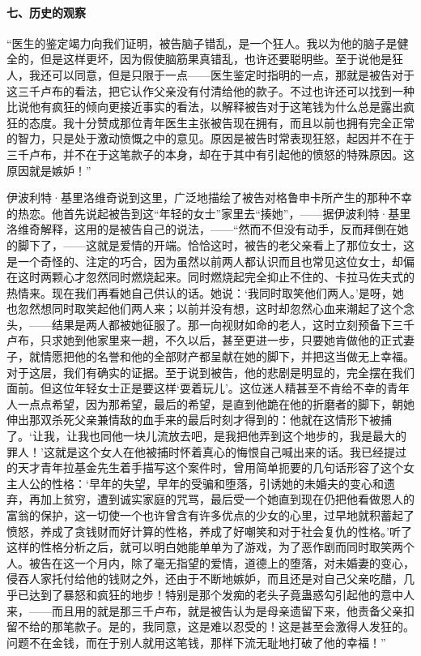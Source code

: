 \paragraph*{七、历史的观察}
\par “医生的鉴定竭力向我们证明，被告脑子错乱，是一个狂人。我以为他的脑子是健全的，但是这样更坏，因为假使脑筋果真错乱，也许还要聪明些。至于说他是狂人，我还可以同意，但是只限于一点——医生鉴定时指明的一点，那就是被告对于这三千卢布的看法，把它认作父亲没有付清给他的款子。不过也许还可以找到一种比说他有疯狂的倾向更接近事实的看法，以解释被告对于这笔钱为什么总是露出疯狂的态度。我十分赞成那位青年医生主张被告现在拥有，而且以前也拥有完全正常的智力，只是处于激动愤慨之中的意见。原因是被告时常表现狂怒，起因并不在于三千卢布，并不在于这笔款子的本身，却在于其中有引起他的愤怒的特殊原因。这原因就是嫉妒！”
\par 伊波利特·基里洛维奇说到这里，广泛地描绘了被告对格鲁申卡所产生的那种不幸的热恋。他首先说起被告到这“年轻的女士”家里去“揍她”，——据伊波利特·基里洛维奇解释，这用的是被告自己的说法，——“然而不但没有动手，反而拜倒在她的脚下了，——这就是爱情的开端。恰恰这时，被告的老父亲看上了那位女士，这是一个奇怪的、注定的巧合，因为虽然以前两人都认识而且也常见这位女士，却偏在这时两颗心才忽然同时燃烧起来。同时燃烧起完全抑止不住的、卡拉马佐夫式的热情来。现在我们再看她自己供认的话。她说：‘我同时取笑他们两人。’是呀，她也忽然想同时取笑起他们两人来；以前并没有想，这时却忽然心血来潮起了这个念头，——结果是两人都被她征服了。那一向视财如命的老人，这时立刻预备下三千卢布，只求她到他家里来一趟，不久以后，甚至更进一步，只要她肯做他的正式妻子，就情愿把他的名誉和他的全部财产都呈献在她的脚下，并把这当做无上幸福。对于这层，我们有确实的证据。至于说到被告，他的悲剧是明显的，完全摆在我们面前。但这位年轻女士正是要这样‘耍着玩儿’。这位迷人精甚至不肯给不幸的青年人一点点希望，因为那希望，最后的希望，是直到他跪在他的折磨者的脚下，朝她伸出那双杀死父亲兼情敌的血手来的最后时刻才得到的：他就在这情形下被捕了。‘让我，让我也同他一块儿流放去吧，是我把他弄到这个地步的，我是最大的罪人！’这就是这个女人在他被捕时怀着真心的悔恨自己喊出来的话。我已经提过的天才青年拉基金先生着手描写这个案件时，曾用简单扼要的几句话形容了这个女主人公的性格：‘早年的失望，早年的受骗和堕落，引诱她的未婚夫的变心和遗弃，再加上贫穷，遭到诚实家庭的咒骂，最后受一个她直到现在仍把他看做恩人的富翁的保护，这一切使一个也许曾含有许多优点的少女的心里，过早地就积蓄起了愤怒，养成了贪钱财而好计算的性格，养成了好嘲笑和对于社会复仇的性格。’听了这样的性格分析之后，就可以明白她能单单为了游戏，为了恶作剧而同时取笑两个人。被告在这一个月内，除了毫无指望的爱情，道德上的堕落，对未婚妻的变心，侵吞人家托付给他的钱财之外，还由于不断地嫉妒，而且还是对自己父亲吃醋，几乎已达到了暴怒和疯狂的地步！特别是那个发痴的老头子竟蛊惑勾引起他的意中人来，——而且用的就是那三千卢布，就是被告认为是母亲遗留下来，他责备父亲扣留不给的那笔款子。是的，我同意，这是难以忍受的！这是甚至会激得人发狂的。问题不在金钱，而在于别人就用这笔钱，那样下流无耻地打破了他的幸福！”
